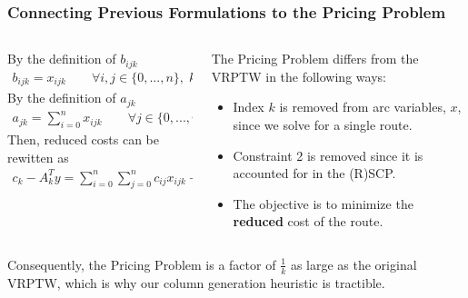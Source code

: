 \documentclass{beamer}
\begin{document}
	\begin{frame}[t]
		\frametitle{Connecting Previous Formulations to the Pricing Problem}
		\small
		\begin{columns}[T]
			\begin{column}{0.6\textwidth}
				By the definition of $b_{ijk}$
				\begin{align*}
					b_{ijk} = x_{ijk} \qquad \forall i, j \in \{0, ..., n\}, \; k \in \Omega
				\end{align*}		
				By the definition of $a_{jk}$
				\begin{align*}
					a_{jk} = \sum_{i=0}^n x_{ijk} \qquad \forall j \in \{0, ..., n\}, \; k \in \Omega
				\end{align*}		
				Then, reduced costs can be rewitten as
				\begin{align*}
					c_k - A_k^T y = {\sum_{i = 0}^{n}{\sum_{j = 0}^{n}{c_{ij}x_{ijk}}}} - {\sum_{j = 1}^{n} \Bigg( y_j \sum_{i = 0}^{n} x_{ijk} \Bigg)}
				\end{align*}
			\end{column}
			\begin{column}{0.4\textwidth}
				The Pricing Problem differs from the VRPTW in the following ways:
				\begin{itemize}
					\item Index $k$ is removed from arc variables, $x$, since we solve for a single route.
					\item Constraint 2 is removed since it is accounted for in the (R)SCP.
					\item The objective is to minimize the \textbf{reduced} cost of the route.
				\end{itemize}
			\end{column}
		\end{columns}
		\vspace{.25cm}
		\begin{block}{}
			Consequently, the Pricing Problem is a factor of $ \frac{1}{k} $ as large as the original VRPTW, which is why our column generation heuristic is tractible.
		\end{block}
		\normalsize
	\end{frame}
\end{document}
